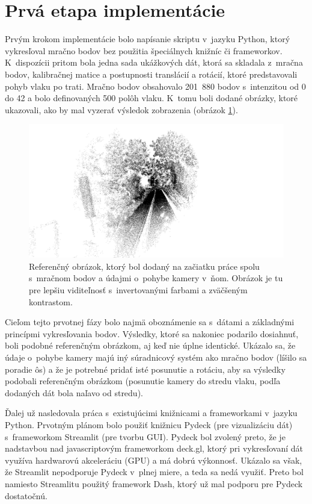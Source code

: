 \section{Prvá etapa implementácie}

Prvým krokom implementácie bolo napísanie skriptu v~jazyku Python, ktorý vykresľoval mračno bodov bez použitia špeciálnych knižníc či frameworkov. K~dispozícii pritom bola jedna sada ukážkových dát, ktorá sa skladala z~mračna bodov, kalibračnej matice a postupnosti translácií a rotácií, ktoré predstavovali pohyb vlaku po trati. Mračno bodov obsahovalo 201~880 bodov s~intenzitou od 0 do 42 a bolo definovaných 500 polôh vlaku. K~tomu boli dodané obrázky, ktoré ukazovali, ako by mal vyzerať výsledok zobrazenia (obrázok \ref{fig:referencny-obrazok}).

\begin{figure}[h]
    \centering
    \includegraphics[width=0.95\linewidth]{obrazky-figures/referencny_obrazok.png}
    \caption{Referenčný obrázok, ktorý bol dodaný na začiatku práce spolu s~mračnom bodov a údajmi o~pohybe kamery v~ňom. Obrázok je tu pre lepšiu viditeľnosť s~invertovanými farbami a zväčšeným kontrastom.}
    \label{fig:referencny-obrazok}
\end{figure}

Cieľom tejto prvotnej fázy bolo najmä oboznámenie sa s~dátami a základnými princípmi vykresľovania bodov. Výsledky, ktoré sa nakoniec podarilo dosiahnuť, boli podobné referenčným obrázkom, aj keď nie úplne identické. Ukázalo sa, že údaje o~pohybe kamery majú iný súradnicový systém ako mračno bodov (líšilo sa poradie ôs) a že je potrebné pridať isté posunutie a rotáciu, aby sa výsledky podobali referenčným obrázkom (posunutie kamery do stredu vlaku, podľa dodaných dát bola naľavo od stredu).

Ďalej už nasledovala práca s~existujúcimi knižnicami a frameworkami v~jazyku Python. Prvotným plánom bolo použiť knižnicu Pydeck (pre vizualizáciu dát) s~frameworkom Streamlit (pre tvorbu GUI). Pydeck bol zvolený preto, že je nadstavbou nad javascriptovým frameworkom deck.gl, ktorý pri vykresľovaní dát využíva hardwarovú akceleráciu (GPU) a má dobrú výkonnosť. Ukázalo sa však, že Streamlit nepodporuje Pydeck v~plnej miere, a teda sa nedá využiť. Preto bol namiesto Streamlitu použitý framework Dash, ktorý už mal podporu pre Pydeck dostatočnú.


